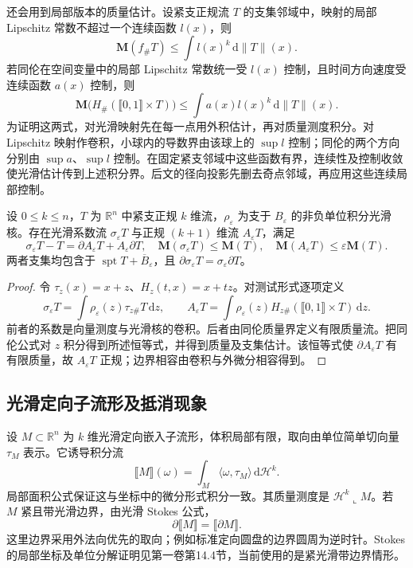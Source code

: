 还会用到局部版本的质量估计。设紧支正规流 \(T\) 的支集邻域中，映射的局部 Lipschitz 常数不超过一个连续函数 \(l(x)\)，则
\begin{equation}\label{g3:eq:current-weighted-pushforward}
	\mathbf M(f_\#T)\le\int l(x)^k\,\mathrm d\|T\|(x).
\end{equation}
若同伦在空间变量中的局部 Lipschitz 常数统一受 \(l(x)\) 控制，且时间方向速度受连续函数 \(a(x)\) 控制，则
\begin{equation}\label{g3:eq:current-weighted-homotopy}
	\mathbf M\bigl(H_\#(\lBrack0,1\rBrack\times T)\bigr)
	\le\int a(x)l(x)^k\,\mathrm d\|T\|(x).
\end{equation}
为证明这两式，对光滑映射先在每一点用外积估计，再对质量测度积分。对 Lipschitz 映射作卷积，小球内的导数界由该球上的 \(\sup l\) 控制；同伦的两个方向分别由 \(\sup a\)、\(\sup l\) 控制。在固定紧支邻域中这些函数有界，连续性及控制收敛使光滑估计传到上述积分界。后文的径向投影先删去奇点邻域，再应用这些连续局部控制。

\begin{proposition}\label{g3:prop:current-regularization-homotopy}
	设 \(0\le k\le n\)，\(T\) 为 \(\mathbb R^n\) 中紧支正规 \(k\) 维流，\(\rho_\varepsilon\) 为支于 \(B_\varepsilon\) 的非负单位积分光滑核。存在光滑系数流 \(\sigma_\varepsilon T\) 与正规 \((k+1)\) 维流 \(A_\varepsilon T\)，满足
	\[
		\sigma_\varepsilon T-T=\partial A_\varepsilon T+A_\varepsilon\partial T,
		\quad \mathbf M(\sigma_\varepsilon T)\le\mathbf M(T),
		\quad \mathbf M(A_\varepsilon T)\le\varepsilon\mathbf M(T).
	\]
	两者支集均包含于 \(\operatorname{spt}T+\overline B_\varepsilon\)，且 \(\partial\sigma_\varepsilon T=\sigma_\varepsilon\partial T\)。
\end{proposition}
\begin{proof}
	令 \(\tau_z(x)=x+z\)、\(H_z(t,x)=x+tz\)。对测试形式逐项定义
	\[
		\sigma_\varepsilon T=\int\rho_\varepsilon(z)\tau_{z\#}T\,\mathrm dz,
		\qquad A_\varepsilon T=\int\rho_\varepsilon(z)
		H_{z\#}(\lBrack0,1\rBrack\times T)\,\mathrm dz.
	\]
	前者的系数是向量测度与光滑核的卷积。后者由同伦质量界定义有限质量流。把同伦公式对 \(z\) 积分得到所述恒等式，并得到质量及支集估计。该恒等式使 \(\partial A_\varepsilon T\) 有有限质量，故 \(A_\varepsilon T\) 正规；边界相容由卷积与外微分相容得到。
\end{proof}

\subsection{光滑定向子流形及抵消现象}
\label{g3:subsec:2201:04}
设 \(M\subset\mathbb R^n\) 为 \(k\) 维光滑定向嵌入子流形，体积局部有限，取向由单位简单切向量 \(\tau_M\) 表示。它诱导积分流
\[
	\lBrack M\rBrack(\omega)
	=\int_M\langle\omega,\tau_M\rangle\,\mathrm d\mathcal H^k.
\]
局部面积公式保证这与坐标中的微分形式积分一致。其质量测度是 \(\mathcal H^k\llcorner M\)。若 \(M\) 紧且带光滑边界，由光滑 Stokes 公式，
\[
	\partial\lBrack M\rBrack=\lBrack\partial M\rBrack.
\]
这里边界采用外法向优先的取向；例如标准定向圆盘的边界圆周为逆时针。Stokes 的局部坐标及单位分解证明见第一卷第14.4节，当前使用的是紧光滑带边界情形。

